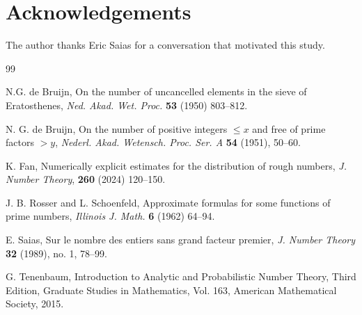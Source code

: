 \documentclass[11pt]{amsart}
\begin{document}
\section*{Acknowledgements}
The author thanks Eric Saias for a conversation that motivated this study.

\begin{thebibliography}{99}

N.G. de Bruijn, On the number of uncancelled elements in the sieve of Eratosthenes, \textit{Ned. Akad. Wet. Proc.} \textbf{53} (1950) 803--812.

N. G. de Bruijn, On the number of positive integers $\le x$ and free of prime factors $>y$, \textit{Nederl. Akad. Wetensch. Proc. Ser. A} \textbf{54} (1951), 50--60.

K. Fan,
Numerically explicit estimates for the distribution of rough numbers,
\textit{J. Number Theory}, \textbf{260} (2024) 120--150.

J. B. Rosser and L. Schoenfeld, 
Approximate formulas for some functions of prime numbers,
\textit{Illinois J. Math.} \textbf{6} (1962) 64--94. 

E. Saias, 
Sur le nombre des entiers sans grand facteur premier,
\textit{J. Number Theory} \textbf{32} (1989), no. 1, 78--99.

G. Tenenbaum, Introduction to Analytic and Probabilistic Number Theory, Third Edition, Graduate Studies in Mathematics, Vol. 163, American Mathematical Society, 2015.

\end{thebibliography}
\end{document}
